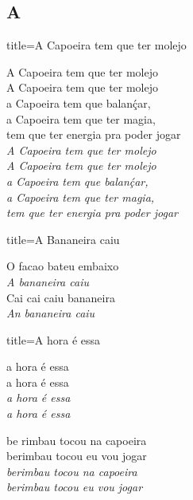 \documentclass[fontsize=14pt, twoside]{scrreprt}
\newcommand\chapTOC[1]{
    \chapter*{#1}
    \addcontentsline{toc}{chapter}{#1}
    \markboth{#1}{#1}}
\begin{document}
\begin{multicols*}{2}
\chapTOC{A}
\begin{song}{title={A Capoeira tem que ter molejo}}
\begin{verse*}
A Capoeira tem que ter molejo \\
A Capoeira tem que ter molejo \\
a Capoeira tem que balanḉar,\\
a Capoeira tem que ter magia,\\
tem que ter energia pra poder jogar\\

    \textit{A Capoeira tem que ter molejo \\
    A Capoeira tem que ter molejo \\
    a Capoeira tem que balanḉar, \\
    a Capoeira tem que ter magia, \\
    tem que ter energia pra poder jogar \\}
\end{verse*}
\end{song}

\begin{song}{title={A Bananeira caiu}}
\begin{verse*}

O facao bateu embaixo\\
\textit{A bananeira caiu} \\
Cai cai caiu bananeira \\
\textit{An bananeira caiu} \\
\end{verse*}
\end{song}
\columnbreak
\begin{song}{title={A hora é essa}}
    \begin{verse*}
        a hora é essa \\
        a hora é essa \\
        \textit{
            a hora é essa \\
            a hora é essa \\
        }
    \end{verse*}
\begin{verse*}
 be rimbau tocou na capoeira \\
berimbau tocou eu vou jogar \\
\textit{berimbau tocou na capoeira \\ 
berimbau tocou eu vou jogar}
\end{verse*}


\end{song}
\end{multicols*}
\end{document}
